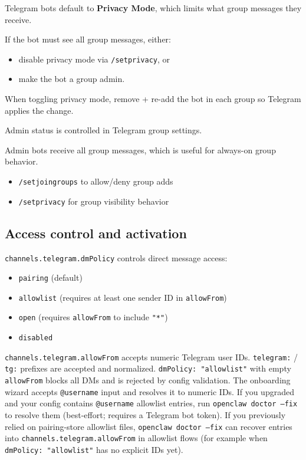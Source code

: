 Telegram bots default to \textbf{Privacy Mode}, which limits what group messages they receive.

If the bot must see all group messages, either:

\begin{itemize}
  \item disable privacy mode via \texttt{/setprivacy}, or
  \item make the bot a group admin.
\end{itemize}


When toggling privacy mode, remove + re-add the bot in each group so Telegram applies the change.


Admin status is controlled in Telegram group settings.

Admin bots receive all group messages, which is useful for always-on group behavior.



\begin{itemize}
  \item \texttt{/setjoingroups} to allow/deny group adds
  \item \texttt{/setprivacy} for group visibility behavior
\end{itemize}



\subsection{Access control and activation}


\texttt{channels.telegram.dmPolicy} controls direct message access:

\begin{itemize}
  \item \texttt{pairing} (default)
  \item \texttt{allowlist} (requires at least one sender ID in \texttt{allowFrom})
  \item \texttt{open} (requires \texttt{allowFrom} to include \texttt{"*"})
  \item \texttt{disabled}
\end{itemize}


\texttt{channels.telegram.allowFrom} accepts numeric Telegram user IDs. \texttt{telegram:} / \texttt{tg:} prefixes are accepted and normalized.
\texttt{dmPolicy: "allowlist"} with empty \texttt{allowFrom} blocks all DMs and is rejected by config validation.
The onboarding wizard accepts \texttt{@username} input and resolves it to numeric IDs.
If you upgraded and your config contains \texttt{@username} allowlist entries, run \texttt{openclaw doctor --fix} to resolve them (best-effort; requires a Telegram bot token).
If you previously relied on pairing-store allowlist files, \texttt{openclaw doctor --fix} can recover entries into \texttt{channels.telegram.allowFrom} in allowlist flows (for example when \texttt{dmPolicy: "allowlist"} has no explicit IDs yet).

